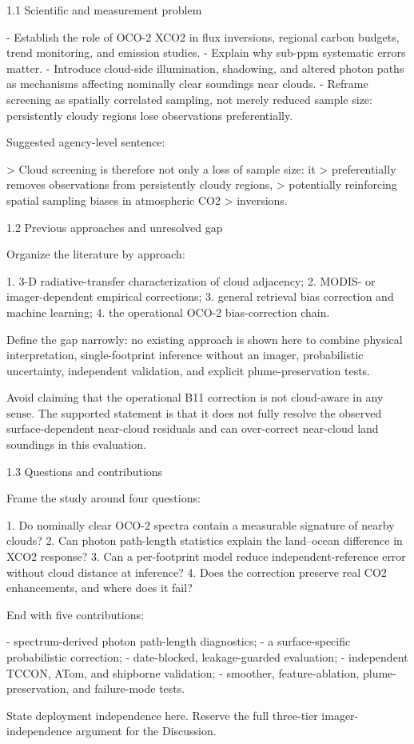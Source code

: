 \introduction  %
\label{sec:intro}


1.1 Scientific and measurement problem

- Establish the role of OCO-2 XCO2 in flux inversions, regional carbon
  budgets, trend monitoring, and emission studies.
- Explain why sub-ppm systematic errors matter.
- Introduce cloud-side illumination, shadowing, and altered photon paths as
  mechanisms affecting nominally clear soundings near clouds.
- Reframe screening as spatially correlated sampling, not merely reduced
  sample size: persistently cloudy regions lose observations preferentially.

Suggested agency-level sentence:

> Cloud screening is therefore not only a loss of sample size: it
> preferentially removes observations from persistently cloudy regions,
> potentially reinforcing spatial sampling biases in atmospheric CO2
> inversions.

1.2 Previous approaches and unresolved gap

Organize the literature by approach:

1. 3-D radiative-transfer characterization of cloud adjacency;
2. MODIS- or imager-dependent empirical corrections;
3. general retrieval bias correction and machine learning;
4. the operational OCO-2 bias-correction chain.

Define the gap narrowly: no existing approach is shown here to combine
physical interpretation, single-footprint inference without an imager,
probabilistic uncertainty, independent validation, and explicit
plume-preservation tests.

Avoid claiming that the operational B11 correction is not cloud-aware in any
sense. The supported statement is that it does not fully resolve the observed
surface-dependent near-cloud residuals and can over-correct near-cloud land
soundings in this evaluation.

1.3 Questions and contributions

Frame the study around four questions:

1. Do nominally clear OCO-2 spectra contain a measurable signature of nearby
   clouds?
2. Can photon path-length statistics explain the land–ocean difference in
   XCO2 response?
3. Can a per-footprint model reduce independent-reference error without cloud
   distance at inference?
4. Does the correction preserve real CO2 enhancements, and where does it
   fail?

End with five contributions:

- spectrum-derived photon path-length diagnostics;
- a surface-specific probabilistic correction;
- date-blocked, leakage-guarded evaluation;
- independent TCCON, ATom, and shipborne validation;
- smoother, feature-ablation, plume-preservation, and failure-mode tests.

State deployment independence here. Reserve the full three-tier
imager-independence argument for the Discussion.

